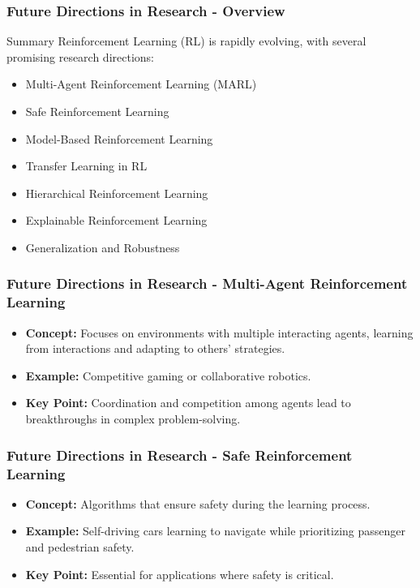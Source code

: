 \documentclass{beamer}
\begin{document}
\begin{frame}[fragile]
    \frametitle{Future Directions in Research - Overview}
    \begin{block}{Summary}
        Reinforcement Learning (RL) is rapidly evolving, with several promising research directions:
    \end{block}
    \begin{itemize}
        \item Multi-Agent Reinforcement Learning (MARL)
        \item Safe Reinforcement Learning
        \item Model-Based Reinforcement Learning
        \item Transfer Learning in RL
        \item Hierarchical Reinforcement Learning
        \item Explainable Reinforcement Learning
        \item Generalization and Robustness
    \end{itemize}
\end{frame}

\begin{frame}[fragile]
    \frametitle{Future Directions in Research - Multi-Agent Reinforcement Learning}
    \begin{itemize}
        \item \textbf{Concept:} Focuses on environments with multiple interacting agents, learning from interactions and adapting to others' strategies.
        \item \textbf{Example:} Competitive gaming or collaborative robotics.
        \item \textbf{Key Point:} Coordination and competition among agents lead to breakthroughs in complex problem-solving.
    \end{itemize}
\end{frame}

\begin{frame}[fragile]
    \frametitle{Future Directions in Research - Safe Reinforcement Learning}
    \begin{itemize}
        \item \textbf{Concept:} Algorithms that ensure safety during the learning process.
        \item \textbf{Example:} Self-driving cars learning to navigate while prioritizing passenger and pedestrian safety.
        \item \textbf{Key Point:} Essential for applications where safety is critical.
    \end{itemize}
\end{frame}
\end{document}
